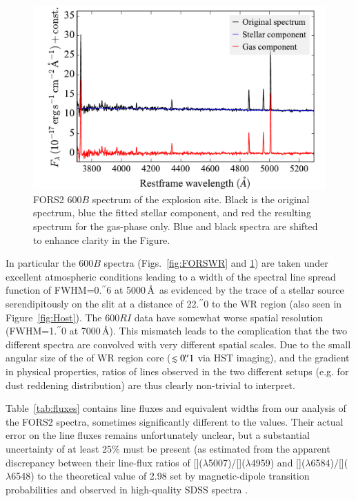 \documentclass[traditabstract]{aa}
\newcommand{\farc}{\hbox{$.\!\!^{\prime\prime}$}}
\newcommand{\oiii}{[\ion{O}{iii}]}
\newcommand{\nii}{[\ion{N}{ii}]}
\begin{document}
\begin{appendix}
\begin{figure}
\includegraphics[angle=0, width=0.9\columnwidth]{Figs/FORS2_3700_5300_starlight.pdf}
\caption{FORS2 600$B$ spectrum of the explosion site. Black is the original spectrum, blue the fitted stellar component, and red the resulting spectrum for the gas-phase only. Blue and black spectra are shifted to enhance clarity in the Figure.}
\label{fig:FORSSN}
\end{figure}

In particular the 600$B$ spectra (Figs.~\ref{fig:FORSWR} and \ref{fig:FORSSN}) are taken under excellent atmospheric conditions leading to a width of the spectral line spread function of FWHM=0\farc{6} at 5000\,\AA\, as evidenced by the trace of a stellar source serendipitously on the slit at a distance of 22\farc{0} to the WR region (also seen in Figure~\ref{fig:Host}). The 600$RI$ data have somewhat worse spatial resolution (FWHM=1\farc{0} at 7000\,\AA). This mismatch leads to the complication that the two different spectra are convolved with very different spatial scales. Due to the small angular size of the of WR region core ($\lesssim 0\farc{1}$ via HST imaging), and the gradient in physical properties, ratios of lines observed in the two different setups (e.g. for dust reddening distribution) are thus clearly non-trivial to interpret.

Table~\ref{tab:fluxes} contains line fluxes and equivalent widths from our analysis of the FORS2 spectra, sometimes significantly different to the \citet{2006A&A...454..103H} values. Their actual error on the line fluxes remains unfortunately unclear, but a substantial uncertainty of at least 25\% must be present (as estimated from the apparent discrepancy between their line-flux ratios of \oiii($\lambda$5007)/\oiii($\lambda$4959) and \nii($\lambda$6584)/\nii($\lambda$6548) to the theoretical value of 2.98 set by magnetic-dipole transition probabilities and observed in high-quality SDSS spectra \citep[e.g.][]{2000MNRAS.312..813S, 2006agna.book.....O, 2016MNRAS.459.3475W}.


\end{appendix}
\end{document}

